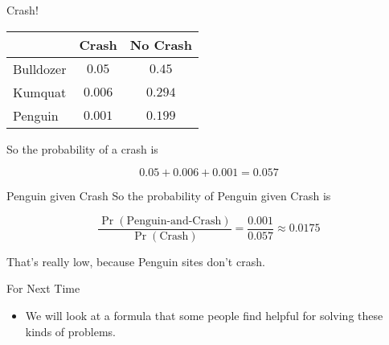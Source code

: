 \documentclass[
  ignorenonframetext,
]{beamer}
\providecommand{\tightlist}{%
  \setlength{\itemsep}{0pt}\setlength{\parskip}{0pt}}
\renewcommand{\,}{\text{, }}
\begin{document}
\begin{frame}{Crash!}
\protect\hypertarget{crash}{}
\begin{longtable}[]{@{}lcc@{}}
\toprule
& Crash & No Crash \\
\midrule
\endhead
Bulldozer & \(0.05\) & \(0.45\) \\
Kumquat & \(0.006\) & \(0.294\) \\
Penguin & \(0.001\) & \(0.199\) \\
\bottomrule
\end{longtable}

So the probability of a crash is

\[
0.05 + 0.006 + 0.001 = 0.057
\]
\end{frame}

\begin{frame}{Penguin given Crash}
\protect\hypertarget{penguin-given-crash}{}
So the probability of Penguin given Crash is

\[
\frac{\Pr(\text{Penguin-and-Crash})}{\Pr(\text{Crash})} = \frac{0.001}{0.057} \approx 0.0175
\]

\pause

That's really low, because Penguin sites don't crash.
\end{frame}

\begin{frame}{For Next Time}
\protect\hypertarget{for-next-time}{}
\begin{itemize}
\tightlist
\item
  We will look at a formula that some people find helpful for solving
  these kinds of problems.
\end{itemize}
\end{frame}
\end{document}
